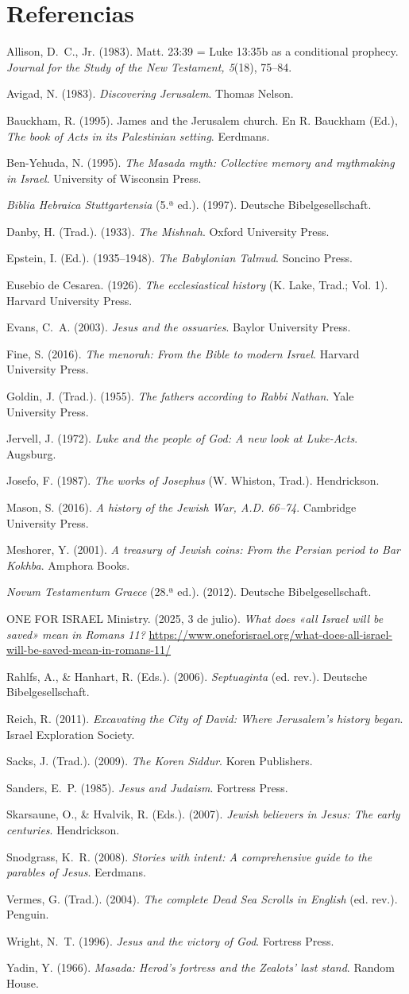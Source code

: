 \documentclass[11pt,letterpaper]{article}
\newcommand{\refapa}[1]{\par{\RaggedRight\hangindent=1.27cm\hangafter=1\noindent #1\par}\vspace{4pt}}
\begin{document}
\section*{Referencias}
\refapa{Allison, D.~C., Jr. (1983). Matt. 23:39 = Luke 13:35b as a conditional prophecy. \emph{Journal for the Study of the New Testament, 5}(18), 75--84.}
\refapa{Avigad, N. (1983). \emph{Discovering Jerusalem}. Thomas Nelson.}
\refapa{Bauckham, R. (1995). James and the Jerusalem church. En R. Bauckham (Ed.), \emph{The book of Acts in its Palestinian setting}. Eerdmans.}
\refapa{Ben-Yehuda, N. (1995). \emph{The Masada myth: Collective memory and mythmaking in Israel}. University of Wisconsin Press.}
\refapa{\emph{Biblia Hebraica Stuttgartensia} (5.ª ed.). (1997). Deutsche Bibelgesellschaft.}
\refapa{Danby, H. (Trad.). (1933). \emph{The Mishnah}. Oxford University Press.}
\refapa{Epstein, I. (Ed.). (1935--1948). \emph{The Babylonian Talmud}. Soncino Press.}
\refapa{Eusebio de Cesarea. (1926). \emph{The ecclesiastical history} (K. Lake, Trad.; Vol. 1). Harvard University Press.}
\refapa{Evans, C.~A. (2003). \emph{Jesus and the ossuaries}. Baylor University Press.}
\refapa{Fine, S. (2016). \emph{The menorah: From the Bible to modern Israel}. Harvard University Press.}
\refapa{Goldin, J. (Trad.). (1955). \emph{The fathers according to Rabbi Nathan}. Yale University Press.}
\refapa{Jervell, J. (1972). \emph{Luke and the people of God: A new look at Luke-Acts}. Augsburg.}
\refapa{Josefo, F. (1987). \emph{The works of Josephus} (W. Whiston, Trad.). Hendrickson.}
\refapa{Mason, S. (2016). \emph{A history of the Jewish War, A.D. 66--74}. Cambridge University Press.}
\refapa{Meshorer, Y. (2001). \emph{A treasury of Jewish coins: From the Persian period to Bar Kokhba}. Amphora Books.}
\refapa{\emph{Novum Testamentum Graece} (28.ª ed.). (2012). Deutsche Bibelgesellschaft.}
\refapa{ONE FOR ISRAEL Ministry. (2025, 3 de julio). \emph{What does «all Israel will be saved» mean in Romans 11?} \url{https://www.oneforisrael.org/what-does-all-israel-will-be-saved-mean-in-romans-11/}}
\refapa{Rahlfs, A., \& Hanhart, R. (Eds.). (2006). \emph{Septuaginta} (ed. rev.). Deutsche Bibelgesellschaft.}
\refapa{Reich, R. (2011). \emph{Excavating the City of David: Where Jerusalem's history began}. Israel Exploration Society.}
\refapa{Sacks, J. (Trad.). (2009). \emph{The Koren Siddur}. Koren Publishers.}
\refapa{Sanders, E.~P. (1985). \emph{Jesus and Judaism}. Fortress Press.}
\refapa{Skarsaune, O., \& Hvalvik, R. (Eds.). (2007). \emph{Jewish believers in Jesus: The early centuries}. Hendrickson.}
\refapa{Snodgrass, K.~R. (2008). \emph{Stories with intent: A comprehensive guide to the parables of Jesus}. Eerdmans.}
\refapa{Vermes, G. (Trad.). (2004). \emph{The complete Dead Sea Scrolls in English} (ed. rev.). Penguin.}
\refapa{Wright, N.~T. (1996). \emph{Jesus and the victory of God}. Fortress Press.}
\refapa{Yadin, Y. (1966). \emph{Masada: Herod's fortress and the Zealots' last stand}. Random House.}
\end{document}
